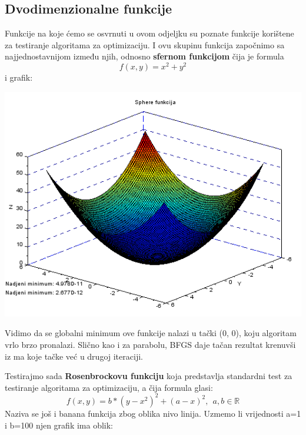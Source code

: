 \documentclass[bosnian,12pt,a4paper]{report}
\begin{document}
\subsection{Dvodimenzionalne funkcije}
\justify
Funkcije na koje ćemo se osvrnuti u ovom odjeljku su poznate funkcije korištene za testiranje algoritama za optimizaciju. I ovu skupinu funkcija započnimo sa najjednostavnijom između njih, odnosno \textbf{sfernom funkcijom} čija je formula 
$$ f(x, y) = x^2 + y^2 $$
i grafik:\\
\begin{center}
   \includegraphics[scale=0.8]{spherefunction.png}
\end{center}

\justify
Vidimo da se globalni minimum ove funkcije nalazi u tački (0, 0), koju algoritam vrlo brzo pronalazi. Slično kao i za parabolu, BFGS daje tačan rezultat krenuvši iz ma koje tačke već u drugoj iteraciji.


\newpage
\justify
Testirajmo sada \textbf{Rosenbrockovu funkciju} koja predstavlja standardni test za testiranje algoritama za optimizaciju, a čija formula glasi:
$$ f(x, y) = b*(y - x^2)^2 + (a - x)^2, ~~ a,b\in\mathbb{R} $$
Naziva se još i banana funkcija zbog oblika nivo linija. Uzmemo li vrijednosti a=1 i b=100 njen grafik ima oblik:\\
\end{document}
